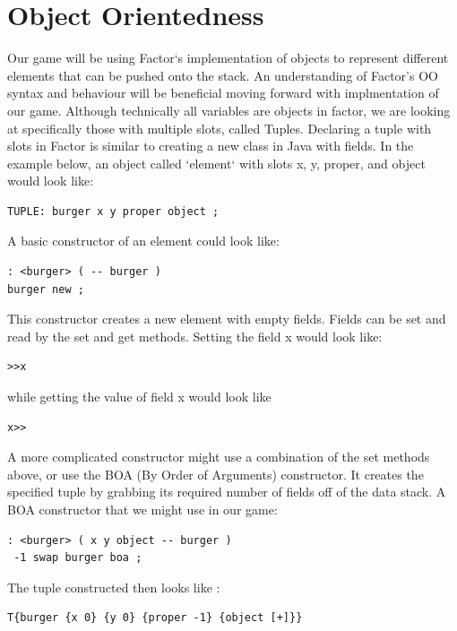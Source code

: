 \documentclass{sig-alternate}
\begin{document}
\section{Object Orientedness}
Our game will be using Factor`s implementation of objects to represent different elements that can be pushed onto the stack. An understanding of Factor's OO syntax and behaviour will be beneficial moving forward with implmentation of our game. Although technically all variables are objects in factor, we are looking at specifically those with multiple slots, called Tuples\cite{OOTuples}. Declaring a tuple with slots in Factor is similar to creating a new class in Java with fields. In the example below, an object called `element` with slots x, y, proper, and object would look like: 
\begin{verbatim}
TUPLE: burger x y proper object ;
\end{verbatim}
A basic constructor of an element could look like:

\begin{verbatim}
: <burger> ( -- burger )
burger new ;
\end{verbatim}

This constructor creates a new element with empty fields. Fields can be set and read by the set and get methods. Setting the field x would look like:

\begin{verbatim}
>>x
\end{verbatim}

while getting the value of field x would look like

\begin{verbatim}
x>>
\end{verbatim}

A more complicated constructor might use a combination of the set methods above, or use the BOA\cite{boa} (By Order of Arguments) constructor. It creates the specified tuple by grabbing its required number of fields off of the data stack. A BOA constructor that we might use in our game: 

\begin{verbatim}
: <burger> ( x y object -- burger )
 -1 swap burger boa ;
\end{verbatim}

The tuple constructed then looks like :

\begin{verbatim}
T{burger {x 0} {y 0} {proper -1} {object [+]}}
\end{verbatim}
\end{document}
